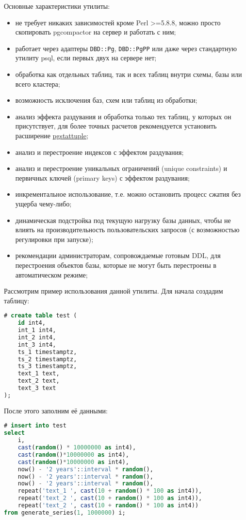 Основные характеристики утилиты:

\begin{itemize}
  \item не требует никаких зависимостей кроме Perl >=5.8.8, можно просто скопировать pgcompactor на сервер и работать с ним;
  \item работает через адаптеры \lstinline!DBD::Pg!, \lstinline!DBD::PgPP! или даже через стандартную утилиту psql, если первых двух на сервере нет;
  \item обработка как отдельных таблиц, так и всех таблиц внутри схемы, базы или всего кластера;
  \item возможность исключения баз, схем или таблиц из обработки;
  \item анализ эффекта раздувания и обработка только тех таблиц, у которых он присутствует, для более точных расчетов рекомендуется установить расширение \href{https://www.postgresql.org/docs/current/static/pgstattuple.html}{pgstattuple};
  \item анализ и перестроение индексов с эффектом раздувания;
  \item анализ и перестроение уникальных ограничений (unique constraints) и первичных ключей (primary keys) с эффектом раздувания;
  \item инкрементальное использование, т.е. можно остановить процесс сжатия без ущерба чему-либо;
  \item динамическая подстройка под текущую нагрузку базы данных, чтобы не влиять на производительность пользовательских запросов (с возможностью регулировки при запуске);
  \item рекомендации администраторам, сопровождаемые готовым DDL, для перестроения объектов базы, которые не могут быть перестроены в автоматическом режиме;
\end{itemize}

Рассмотрим пример использования данной утилиты. Для начала создадим таблицу:

\begin{lstlisting}[language=SQL,label=lst:pgcompactor1,caption=Создаем test таблицу]
# create table test (
    id int4,
    int_1 int4,
    int_2 int4,
    int_3 int4,
    ts_1 timestamptz,
    ts_2 timestamptz,
    ts_3 timestamptz,
    text_1 text,
    text_2 text,
    text_3 text
);
\end{lstlisting}

После этого заполним её данными:

\begin{lstlisting}[language=SQL,label=lst:pgcompactor2,caption=Заполняем данными test таблицу]
# insert into test
select
    i,
    cast(random() * 10000000 as int4),
    cast(random()*10000000 as int4),
    cast(random()*10000000 as int4),
    now() - '2 years'::interval * random(),
    now() - '2 years'::interval * random(),
    now() - '2 years'::interval * random(),
    repeat('text_1 ', cast(10 + random() * 100 as int4)),
    repeat('text_2 ', cast(10 + random() * 100 as int4)),
    repeat('text_2 ', cast(10 + random() * 100 as int4))
from generate_series(1, 1000000) i;
\end{lstlisting}

